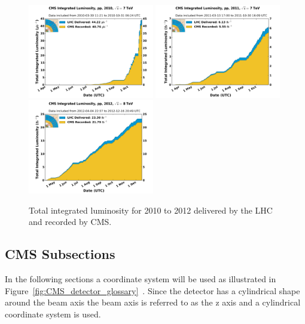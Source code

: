 \begin{figure}[htb]
\centering
\includegraphics[width=0.49\textwidth]{Experiment/int_lumi_per_day_cumulative_pp_2010.pdf}
\includegraphics[width=0.49\textwidth]{Experiment/int_lumi_per_day_cumulative_pp_2011.pdf}
\includegraphics[width=0.49\textwidth]{Experiment/int_lumi_per_day_cumulative_pp_2012.pdf}
\caption{Total integrated luminosity for 2010 to 2012 delivered by the LHC and recorded by CMS.~\cite{cms_lumi_plots}}
\label{fig:CMS_luminosity}
\end{figure}

\subsection{CMS Subsections}
In the following sections a coordinate system will be used as illustrated in Figure~\ref{fig:CMS_detector_glossary}~\cite{Pandolfi_talk}.  Since the detector has a cylindrical shape around the beam axis the beam axis is referred to as the z axis and a cylindrical coordinate system is used.

